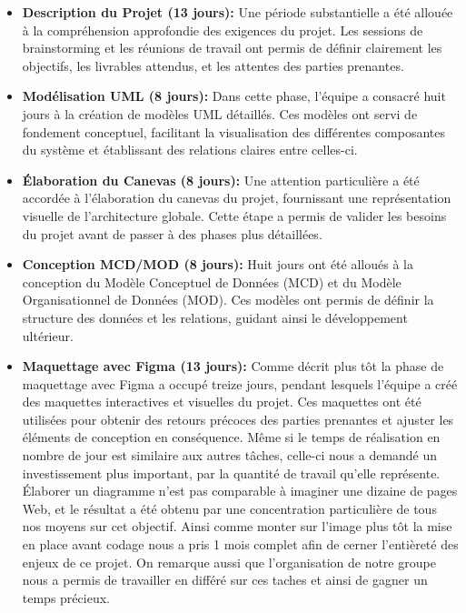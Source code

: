 \documentclass[mstat,12pt]{unswthesis}
\begin{document}
\begin{adjustwidth}{-2cm}{}
\begin{itemize}
\item
  \textbf{Description du Projet (13 jours):} Une période substantielle a
  été allouée à la compréhension approfondie des exigences du projet.
  Les sessions de brainstorming et les réunions de travail ont permis de
  définir clairement les objectifs, les livrables attendus, et les
  attentes des parties prenantes.
\item
  \textbf{Modélisation UML (8 jours):} Dans cette phase, l'équipe a
  consacré huit jours à la création de modèles UML détaillés. Ces
  modèles ont servi de fondement conceptuel, facilitant la visualisation
  des différentes composantes du système et établissant des relations
  claires entre celles-ci.
\item
  \textbf{Élaboration du Canevas (8 jours):} Une attention particulière
  a été accordée à l'élaboration du canevas du projet, fournissant une
  représentation visuelle de l'architecture globale. Cette étape a
  permis de valider les besoins du projet avant de passer à des phases
  plus détaillées.
\item
  \textbf{Conception MCD/MOD (8 jours):} Huit jours ont été alloués à la
  conception du Modèle Conceptuel de Données (MCD) et du Modèle
  Organisationnel de Données (MOD). Ces modèles ont permis de définir la
  structure des données et les relations, guidant ainsi le développement
  ultérieur.
\item
  \textbf{Maquettage avec Figma (13 jours):} Comme décrit plus tôt la
  phase de maquettage avec Figma a occupé treize jours, pendant lesquels
  l'équipe a créé des maquettes interactives et visuelles du projet. Ces
  maquettes ont été utilisées pour obtenir des retours précoces des
  parties prenantes et ajuster les éléments de conception en
  conséquence. Même si le temps de réalisation en nombre de jour est
  similaire aux autres tâches, celle-ci nous a demandé un investissement
  plus important, par la quantité de travail qu'elle représente.
  Élaborer un diagramme n'est pas comparable à imaginer une dizaine de
  pages Web, et le résultat a été obtenu par une concentration
  particulière de tous nos moyens sur cet objectif. Ainsi comme monter
  sur l'image plus tôt la mise en place avant codage nous a pris 1 mois
  complet afin de cerner l'entièreté des enjeux de ce projet. On
  remarque aussi que l'organisation de notre groupe nous a permis de
  travailler en différé sur ces taches et ainsi de gagner un temps
  précieux.
\end{itemize}


\end{adjustwidth}
\end{document}

